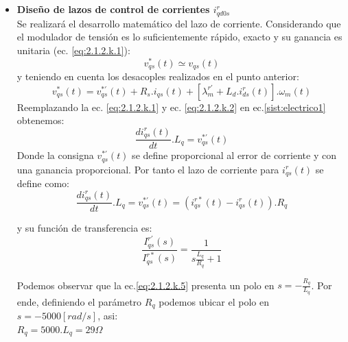\documentclass[10pt]{article}
\begin{document}
\begin{itemize}
\item \textbf{Diseño de lazos de control de corrientes $i^{r}_{qd0s}$}\\
Se realizará el desarrollo matemático del lazo de corriente. Considerando que el modulador de tensión es lo suficientemente rápido, exacto y su ganancia es unitaria (ec. \ref{eq:2.1.2.k.1}):
	\begin{equation}
	v^{*}_{qs}(t)\simeq v_{qs}(t)
	\label{eq:2.1.2.k.1}
	\end{equation}
y teniendo en cuenta los desacoples realizados en el punto anterior:
	\begin{equation}
	v^{*}_{qs}(t)= v^{*'}_{qs}(t) + R_{s}. i_{qs}(t) + [\lambda^{r'}_{m}+L_{d}.i^{r}_{ds}(t)].\omega_{m}(t)
	\label{eq:2.1.2.k.2}
	\end{equation}
Reemplazando la ec. \ref{eq:2.1.2.k.1} y ec. \ref{eq:2.1.2.k.2} en ec.\ref{sist:electrico1} obtenemos:
\begin{equation}
	\frac{di^{r}_{qs}(t)}{dt} . L_{q}= v^{*'}_{qs}(t)
	\label{eq:2.1.2.k.3}
	\end{equation}
	Donde la consigna $v^{*'}_{qs}(t)$ se define proporcional al error de corriente y con una ganancia proporcional. Por tanto el lazo de corriente para $i^{r}_{qs}(t)$ se define como:
	\begin{equation}
	\frac{di^{r}_{qs}(t)}{dt} . L_{q}= v^{*'}_{qs}(t)=(i^{r*}_{qs}(t)-i^{r}_{qs}(t)).R_{q}
	\label{eq:2.1.2.k.4}
	\end{equation}
	
	y su función de transferencia es:
		\begin{equation}
	\frac{I^{r'}_{qs}(s)}{I^{r*}_{qs}(s)}=\frac{1}{s\frac{L_{q}}{R_{q}}+1}
	\label{eq:2.1.2.k.5}
	\end{equation}
	
	Podemos observar que la ec.\ref{eq:2.1.2.k.5} presenta un polo en $s=-\frac{R_{q}}{L_{q}}$. Por ende, definiendo el parámetro $R_{q}$ podemos ubicar el polo en $s=-5000[rad/s]$, asi:\\
	$R_{q}=5000 . L_{q}=29\Omega$
	

\end{itemize}
\end{document}
